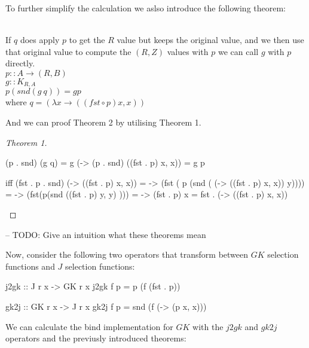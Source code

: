 \documentclass[runningheads]{llncs}
\begin{document}
To further simplify the calculation we aslso introduce the following
theorem:

\begin{theorem}[Theorem 2]\\
If $q$ does apply $p$ to get the $R$ value but keeps the original value, and we then use that 
original value to compute the $(R,Z)$ values with $p$ we can call $g$ with $p$ directly.\\
$p :: A \rightarrow (R,B)$\\
$g :: K_{R,A}$\\
$p (snd (g\:q)) = g p$\\
where $q = (\lambda x \rightarrow ((fst \circ p) x, x))$\\
\end{theorem}

And we can proof Theorem 2 by utilising Theorem 1.

\begin{proof}[Theorem 1]\\
\begin{haskell}
(p . snd) (g q)
= g (\x -> (p . snd) ((fst . p) x, x))
= g p

iff 
(fst . p . snd) (\x -> ((fst . p) x, x))
= \y -> (fst ( p (snd ( (\x -> ((fst . p) x, x)) y))))
= \y -> (fst(p(snd ((fst . p) y, y) )))
= \x -> (fst . p) x
= fst . (\x -> ((fst . p) x, x)) 
\end{haskell}
\end{proof}

-- TODO: Give an intuition what these theorems mean

Now, consider the following two operators that transform between \(GK\)
selection functions and \(J\) selection functions:

\begin{code}
j2gk :: J r x -> GK r x
j2gk f p = p (f (fst . p))
\end{code}

\begin{code}
gk2j :: GK r x -> J r x
gk2j f p = snd (f (\x -> (p x, x)))
\end{code}

We can calculate the bind implementation for \(GK\) with the \(j2gk\)
and \(gk2j\) operators and the previusly introduced theorems:
\end{document}
